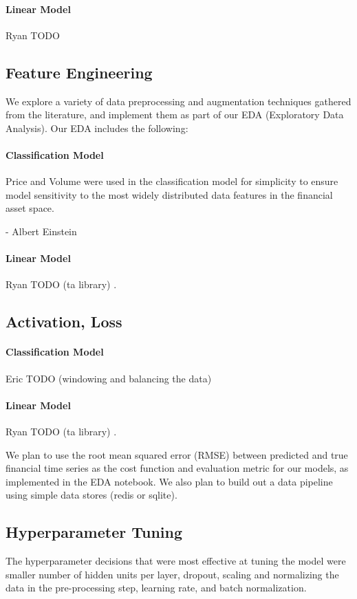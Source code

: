 \documentclass{article}
\begin{document}
\begin{multicols}{2}
\paragraph{Linear Model}
Ryan TODO


\subsection{Feature Engineering}
We explore a variety of data preprocessing and augmentation techniques gathered from the literature, and implement them as part of our EDA (Exploratory Data Analysis). Our EDA includes the following:
\paragraph{Classification Model}
Price and Volume were used in the classification model for simplicity to ensure model sensitivity to the most widely distributed data features in the financial asset space.

 - Albert Einstein

\paragraph{Linear Model}
Ryan TODO (ta library) \cite{3_website}.


\subsection{Activation, Loss}
\paragraph{Classification Model}
Eric TODO (windowing and balancing the data) \cite{4_website}
\paragraph{Linear Model}
Ryan TODO (ta library) \cite{3_website}.

We plan to use the root mean squared error (RMSE) between predicted and true financial time series as the cost function and evaluation metric for our models, as implemented in the EDA notebook. We also plan to build out a data pipeline using simple data stores (redis or sqlite).


\subsection{Hyperparameter Tuning}
The hyperparameter decisions that were most effective at tuning the model were smaller number of hidden units per layer, dropout, scaling and normalizing the data in the pre-processing step, learning rate, and batch normalization.

\end{multicols}
\end{document}
